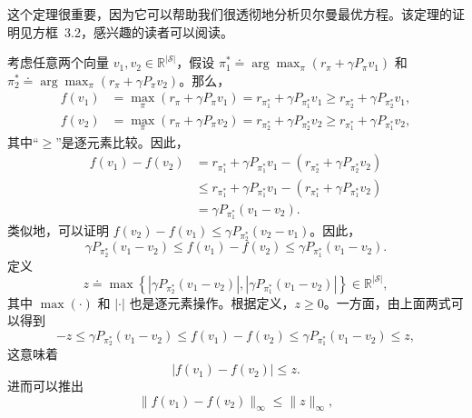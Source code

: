 这个定理很重要，因为它可以帮助我们很透彻地分析贝尔曼最优方程。该定理的证明见方框~3.2，感兴趣的读者可以阅读。

\begin{derivation}
\label{box:rl-fv-proof}
考虑任意两个向量 $v_1, v_2 \in \mathbb{R}^{|\mathcal{S}|}$，假设 $\pi_1^* \doteq \arg\max_\pi(r_\pi + \gamma P_\pi v_1)$ 和 $\pi_2^* \doteq \arg\max_\pi(r_\pi + \gamma P_\pi v_2)$。那么，
\begin{align}
  f(v_1) &= \max_\pi (r_\pi + \gamma P_\pi v_1) = r_{\pi_1^*} + \gamma P_{\pi_1^*} v_1 \geqslant r_{\pi_2^*} + \gamma P_{\pi_2^*} v_1,\\
  f(v_2) &= \max_\pi (r_\pi + \gamma P_\pi v_2) = r_{\pi_2^*} + \gamma P_{\pi_2^*} v_2 \geqslant r_{\pi_1^*} + \gamma P_{\pi_1^*} v_2,
\end{align}
其中“$\geqslant$”是逐元素比较。因此，
\begin{equation}
\begin{aligned}
  f(v_1) - f(v_2) &= r_{\pi_1^*} + \gamma P_{\pi_1^*} v_1 - (r_{\pi_2^*} + \gamma P_{\pi_2^*} v_2)\\
  &\leqslant r_{\pi_1^*} + \gamma P_{\pi_1^*} v_1 - (r_{\pi_1^*} + \gamma P_{\pi_1^*} v_2)\\
  &= \gamma P_{\pi_1^*} (v_1 - v_2).
\end{aligned}
\end{equation}
类似地，可以证明 $f(v_2) - f(v_1) \leqslant \gamma P_{\pi_2^*}(v_2 - v_1)$。因此，
\begin{equation}
  \gamma P_{\pi_2^*} (v_1 - v_2) \leqslant f(v_1) - f(v_2) \leqslant \gamma P_{\pi_1^*} (v_1 - v_2).
\end{equation}
定义
\begin{equation}
  z \doteq \max \left\{ \left| \gamma P_{\pi_2^*} (v_1 - v_2) \right|, \left| \gamma P_{\pi_1^*} (v_1 - v_2) \right| \right\} \in \mathbb{R}^{|\mathcal{S}|},
\end{equation}
其中 $\max(\cdot)$ 和 $|\cdot|$ 也是逐元素操作。根据定义，$z \geqslant 0$。一方面，由上面两式可以得到
\begin{equation}
  -z \leqslant \gamma P_{\pi_2^*} (v_1 - v_2) \leqslant f(v_1) - f(v_2) \leqslant \gamma P_{\pi_1^*} (v_1 - v_2) \leqslant z,
\end{equation}
这意味着
\begin{equation}
  | f(v_1) - f(v_2) | \leqslant z.
\end{equation}
进而可以推出
\begin{equation}
  \| f(v_1) - f(v_2) \|_\infty \leqslant \| z \|_\infty,

\end{equation}
\end{derivation}
